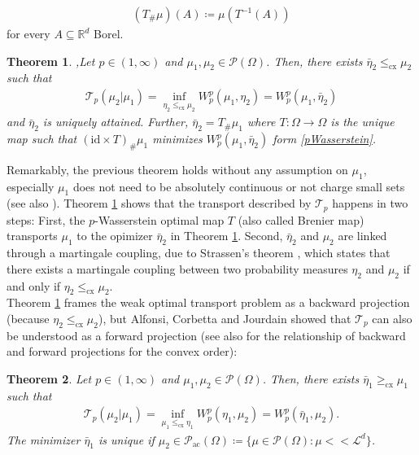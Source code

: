 \documentclass[10pt,a4paper]{amsart}
\newcommand{\RR}{\mathbb{R}}
\newtheorem{thm}{Theorem}[section]
\begin{document}
\begin{gather*}
	(T_\#\mu)(A)\coloneqq \mu(T^{-1}(A))
\end{gather*}
for every $A\subseteq\RR^d$ Borel.
\begin{thm}\cite[Prop 1.1]{gozlan2020},\cite[Thm 2.1]{alfonsi2020}\label{weakforwardprojthm}
	Let $p\in(1,\infty)$ and $\mu_1,\mu_2\in\mathcal P(\Omega)$. Then, there exists $\bar\eta_2\leq_{\text{cx}}\mu_2$ such that
	\begin{gather*}
		\mathcal T_p(\mu_2|\mu_1)=\inf_{\eta_2\leq_{\text{cx}}\mu_2}W_p^p(\mu_1,\eta_2)=W_p^p(\mu_1,\bar\eta_2)
	\end{gather*}
	and $\bar\eta_2$ is uniquely attained. Further, $\bar\eta_2=T_{\#}\mu_1$ where $T:\Omega\rightarrow\Omega$ is the unique map such that $(\text{id}\times T)_{\#}\mu_1$ minimizes $W_p^p(\mu_1,\bar\eta_2)$ form \eqref{pWasserstein}.
\end{thm}
Remarkably, the previous theorem holds without any assumption on $\mu_1$, especially $\mu_1$ does not need to be absolutely continuous or not charge small sets (see also \cite[Rmk 1.2]{gozlan2017}).
Theorem \ref{weakforwardprojthm} shows that the transport described by $\mathcal T_p$ happens in two steps: First, the $p$-Wasserstein optimal map $T$ (also called Brenier map) transports $\mu_1$ to the opimizer $\bar\eta_2$ in 
Theorem \ref{weakforwardprojthm}. Second, $\bar\eta_2$ and $\mu_2$ are linked through a martingale coupling, due to Strassen's theorem \cite{strassen1965}, which states that there exists a martingale coupling between two probability measures $\eta_2$ and $\mu_2$ if and only if $\eta_2\leq_{\text{cx}}\mu_2$.\\
Theorem \ref{weakforwardprojthm} frames the weak optimal transport problem as a backward projection (because $\eta_2\leq_{\text{cx}}\mu_2$), but Alfonsi, Corbetta and Jourdain \cite{alfonsi2020} showed that $\mathcal T_p$ can also be understood as a forward projection (see also \cite[Sec 8]{kim2024} for the relationship of backward and forward projections for the convex order):
\begin{thm}\cite[Thm 4.1, Cor 4.4]{alfonsi2020}\label{weakbackwardprojthm}
	Let $p\in (1,\infty)$ and $\mu_1,\mu_2\in\mathcal P(\Omega)$. Then, there exists $\bar\eta_1\geq_{\text{cx}}\mu_1$ such that
	\begin{gather*}
		\mathcal T_p(\mu_2|\mu_1)=\inf_{\mu_1\leq_{\text{cx}}\eta_1}W_p^p(\eta_1,\mu_2)=W_p^p(\bar\eta_1,\mu_2).
	\end{gather*}
	The minimizer $\bar\eta_1$ is unique if $\mu_2\in\mathcal P_{\text{ac}}(\Omega)\coloneqq\big\{\mu\in\mathcal P(\Omega):\mu<<\mathcal L^d\}$.
\end{thm}
\end{document}

